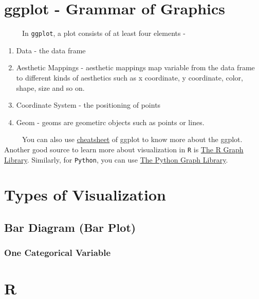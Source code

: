 \documentclass[
  letterpaper,
  DIV=11,
  numbers=noendperiod]{scrreprt}
\begin{document}
\section{ggplot - Grammar of
Graphics}\label{ggplot---grammar-of-graphics}

~~~~~In \texttt{ggplot}, a plot consists of at least four elements -

\begin{enumerate}
\def\labelenumi{\arabic{enumi}.}
\item
  Data - the data frame
\item
  Aesthetic Mappings - aesthetic mappings map variable from the data
  frame to different kinds of aesthetics such as x coordinate, y
  coordinate, color, shape, size and so on.
\item
  Coordinate System - the positioning of points
\item
  Geom - geoms are geometirc objects such as points or lines.
\end{enumerate}

~~~~~You can also use
\href{https://posit.co/resources/cheatsheets/}{cheatsheet} of ggplot to
know more about the ggplot. Another good source to learn more about
visualization in \texttt{R} is \href{https://r-graph-gallery.com/}{The R
Graph Library}. Similarly, for \texttt{Python}, you can use
\href{https://python-graph-gallery.com/}{The Python Graph Library}.

\section{Types of Visualization}\label{types-of-visualization}

\subsection{Bar Diagram (Bar Plot)}\label{bar-diagram-bar-plot}

\subsubsection{One Categorical Variable}\label{one-categorical-variable}

\section{R}
\end{document}
